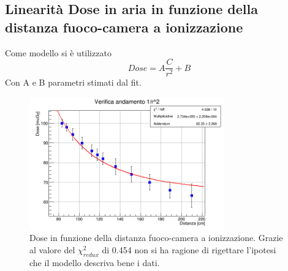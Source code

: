 \documentclass[a4paper]{article}
\begin{document}
\subsection{Linearità Dose in aria in funzione della distanza fuoco-camera a ionizzazione}
Come modello si è utilizzato \begin{equation}
Dose=A\frac{C}{r^{2}}+B
\end{equation}
Con A e B parametri stimati dal fit.
\begin{figure}[H]
\centering
\includegraphics[width=0.75\textwidth]{Dosevsdistancewithpar.png}
\caption{Dose in funzione della distanza fuoco-camera a ionizzazione. Grazie al valore del $\chi^{2}_{redux}$ di 0.454 non si ha ragione di rigettare l'ipotesi che il modello descriva bene i dati.}
\end{figure}


\newpage

\end{document}
